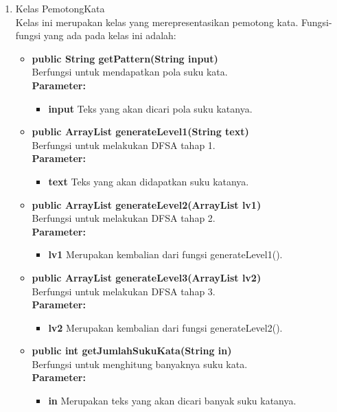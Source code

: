 \begin{enumerate}
	\item Kelas PemotongKata\\
	Kelas ini merupakan kelas yang merepresentasikan pemotong kata. Fungsi-fungsi yang ada pada kelas ini adalah:
	\begin{itemize}
		\item \textbf{public String getPattern(String input)}\\
		Berfungsi untuk mendapatkan pola suku kata.\\
		\textbf{Parameter:}
		\begin{itemize}
			\item \textbf{input} Teks yang akan dicari pola suku katanya.
		\end{itemize}
		
		\item \textbf{public ArrayList generateLevel1(String text)}\\
		Berfungsi untuk melakukan DFSA tahap 1.\\
		\textbf{Parameter:}
		\begin{itemize}
			\item \textbf{text} Teks yang akan didapatkan suku katanya.
		\end{itemize}
		
		\item \textbf{public ArrayList generateLevel2(ArrayList lv1)}\\
		Berfungsi untuk melakukan DFSA tahap 2.\\
		\textbf{Parameter:}
		\begin{itemize}
			\item \textbf{lv1} Merupakan kembalian dari fungsi generateLevel1().
		\end{itemize}
		
		\item \textbf{public ArrayList generateLevel3(ArrayList lv2)}\\
		Berfungsi untuk melakukan DFSA tahap 3.\\
		\textbf{Parameter:}
		\begin{itemize}
			\item \textbf{lv2} Merupakan kembalian dari fungsi generateLevel2().
		\end{itemize}
		
		\item \textbf{public int getJumlahSukuKata(String in)}\\
		Berfungsi untuk menghitung banyaknya suku kata.\\
		\textbf{Parameter:}
		\begin{itemize}
			\item \textbf{in} Merupakan teks yang akan dicari banyak suku katanya.
		\end{itemize}
	\end{itemize}
	

\end{enumerate}
